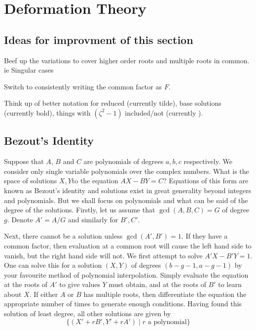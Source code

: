 \section{Deformation Theory}
\label{sec:Deformation Theory}

\subsection{Ideas for improvment of this section}
\label{sec:Ideas for improvment}
Beef up the variations to cover higher order roots and multiple roots in common. ie Singular cases

Switch to consistently writing the common factor as $F$.

Think up of better notation for reduced (currently tilde), base solutions (currently bold), things with $(ζ^2-1)$ included/not (currently ).






















\subsection{Bezout's Identity}
\label{sub:Bezout's Identity}
Suppose that $A$, $B$ and $C$ are polynomials of degrees $a,b,c$ respectively. We consider only single variable polynomials over the complex numbers. What is the space of solutions $X,Y$to the equation $AX - BY = C$? Equations of this form are known as Bezout's identity and solutions exist in great generality beyond integers and polynomials. But we shall focus on polynomials and what can be said of the degree of the solutions. Firstly, let us assume that $\gcd(A,B,C) = G$ of degree $g$. Denote $A' = A/G$ and similarly for $B',C'$.

Next, there cannot be a solution unless $\gcd(A',B') = 1$. If they have a common factor, then evaluation at a common root will cause the left hand side to vanish, but the right hand side will not. We first attempt to solve $A'X-B'Y = 1$. One can solve this for a solution $(X,Y)$ of degrees $(b-g-1,a-g-1)$ by your favourite method of polynomial interpolation. Simply evaluate the equation at the roots of $A'$ to give values $Y$ must obtain, and at the roots of $B'$ to learn about $X$. If either $A$ or $B$ has multiple roots, then differentiate the equation the appropriate number of times to generate enough conditions. Having found this solution of least degree, all other solutions are given by
\[
\{(X' + rB', Y' + rA') \mid r \text{ a polynomial} \}
\]

